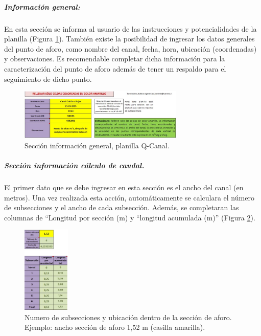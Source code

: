 \documentclass[]{article}
\begin{document}
\subparagraph{Información general:}
En esta sección se informa al usuario de las instrucciones y potencialidades de la planilla (Figura \ref{info_general}). También existe la posibilidad de ingresar los datos generales del punto de aforo, como nombre del canal, fecha, hora, ubicación (coordenadas) y observaciones. Es recomendable completar dicha información para la caracterización del punto de aforo además de tener un respaldo para el seguimiento de dicho punto.

\begin{figure}[H]
\centering
\includegraphics[width=0.7\textwidth]{images/info_general.eps}
\caption{Sección información general, planilla Q-Canal.}
\label{info_general}
\end{figure}

\subparagraph{Sección información cálculo de caudal.}
El primer dato que se debe ingresar en esta sección es el ancho del canal (en metros). Una vez realizada esta acción, automáticamente se calculara el número de subsecciones y el ancho de cada subsección. Además, se completaran las columnas de “Longitud por sección (m) y “longitud acumulada (m)” (Figura \ref{casilla}).

\begin{figure}[H]
\centering
\includegraphics[width=0.2\textwidth]{images/n_subsecciones.eps}
\caption{Numero de subsecciones y ubicación dentro de la sección de aforo. Ejemplo: ancho sección de aforo 1,52 m (casilla amarilla).}
\label{casilla}
\end{figure}
\end{document}
